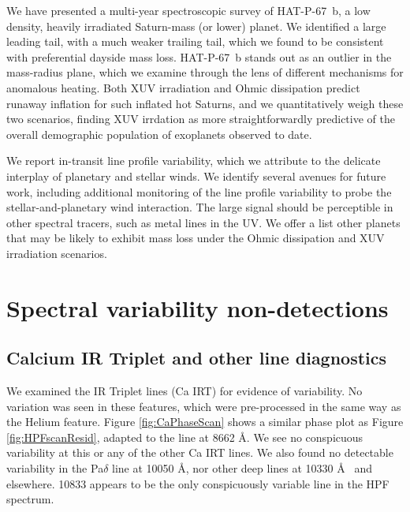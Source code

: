 \documentclass[twocolumn]{aastex631}
\begin{document}
We have presented a multi-year spectroscopic survey of HAT-P-67~b, a low density, heavily irradiated Saturn-mass (or lower) planet.  We identified a large leading tail, with a much weaker trailing tail, which we found to be consistent with preferential dayside mass loss.  HAT-P-67~b stands out as an outlier in the mass-radius plane, which we examine through the lens of different mechanisms for anomalous heating.  Both XUV irradiation and Ohmic dissipation predict runaway inflation for such inflated hot Saturns, and we quantitatively weigh these two scenarios, finding XUV irrdation as more straightforwardly predictive of the overall demographic population of exoplanets observed to date.  

We report in-transit line profile variability, which we attribute to the delicate interplay of planetary and stellar winds.  We identify several avenues for future work, including additional monitoring of the line profile variability to probe the stellar-and-planetary wind interaction.  The large signal should be perceptible in other spectral tracers, such as metal lines in the UV.  We offer a list other planets that may be likely to exhibit mass loss under the Ohmic dissipation and XUV irradiation scenarios.

\clearpage
\pagebreak


\appendix

\section{Spectral variability non-detections} \label{appendixSec}
\subsection{Calcium IR Triplet and other line diagnostics}
We examined the  IR Triplet lines (Ca IRT) for evidence of variability.  No variation was seen in these features, which were pre-processed in the same way as the Helium feature.  Figure \ref{fig:CaPhaseScan} shows a similar phase plot as Figure \ref{fig:HPFscanResid}, adapted to the line at 8662 \AA.  We see no conspicuous variability at this or any of the other Ca IRT lines.  We also found no detectable variability in the Pa$\delta$ line at 10050 \AA, nor other deep lines at 10330 \AA~ and elsewhere.   10833 appears to be the only conspicuously variable line in the HPF spectrum.
\end{document}
